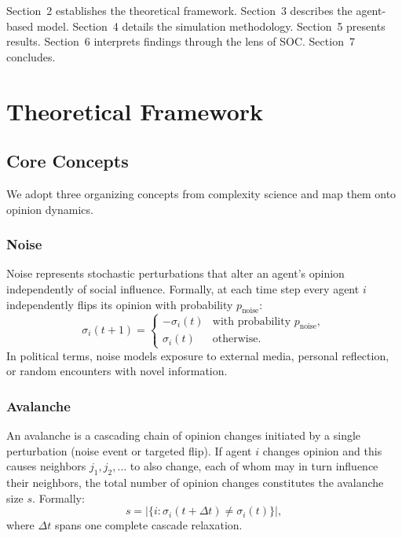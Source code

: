 \documentclass[11pt,twocolumn]{article}
\begin{document}
Section~2 establishes the theoretical framework. Section~3 describes the agent-based model. Section~4 details the simulation methodology. Section~5 presents results. Section~6 interprets findings through the lens of SOC. Section~7 concludes.

\section{Theoretical Framework}

\subsection{Core Concepts}

We adopt three organizing concepts from complexity science and map them onto opinion dynamics.

\subsubsection{Noise}

Noise represents stochastic perturbations that alter an agent's opinion independently of social influence. Formally, at each time step every agent $i$ independently flips its opinion with probability $p_{\text{noise}}$:
\begin{equation}
\sigma_i(t+1) = \begin{cases} -\sigma_i(t) & \text{with probability } p_{\text{noise}},\\ \sigma_i(t) & \text{otherwise.} \end{cases}
\end{equation}
In political terms, noise models exposure to external media, personal reflection, or random encounters with novel information.

\subsubsection{Avalanche}

An avalanche is a cascading chain of opinion changes initiated by a single perturbation (noise event or targeted flip). If agent $i$ changes opinion and this causes neighbors $j_1, j_2, \ldots$ to also change, each of whom may in turn influence their neighbors, the total number of opinion changes constitutes the avalanche size $s$. Formally:
\begin{equation}
s = |\{i : \sigma_i(t + \Delta t) \neq \sigma_i(t)\}|,
\end{equation}
where $\Delta t$ spans one complete cascade relaxation.
\end{document}
